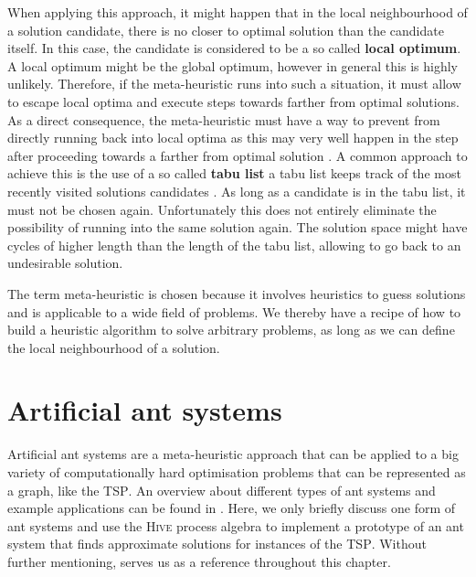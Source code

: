 When applying this approach, it might happen that in the local neighbourhood of a solution candidate, there is no closer to optimal solution than the candidate itself. In this case, the candidate is considered to be a so called \textbf{local optimum}. A local optimum might be the global optimum, however in general this is highly unlikely. Therefore, if the meta-heuristic runs into such a situation, it must allow to escape local optima and execute steps towards farther from optimal solutions. As a direct consequence, the meta-heuristic must have a way to prevent from directly running back into local optima as this may very well happen in the step after proceeding towards a farther from optimal solution \cite{}. A common approach to achieve this is the use of a so called \textbf{tabu list} a tabu list keeps track of the most recently visited solutions candidates \cite{}. As long as a candidate is in the tabu list, it must not be chosen again. Unfortunately this does not entirely eliminate the possibility of running into the same solution again. The solution space might have cycles of higher length than the length of the tabu list, allowing to go back to an undesirable solution.

The term meta-heuristic is chosen because it involves heuristics to guess solutions and is applicable to a wide field of problems. We thereby have a recipe of how to build a heuristic algorithm to solve arbitrary problems, as long as we can define the local neighbourhood of a solution.

\section{Artificial ant systems}
\label{chp:ant_system}
Artificial ant systems are a meta-heuristic approach that can be applied to a big variety of computationally hard optimisation problems that can be represented as a graph, like the \textsc{TSP}. An overview about different types of ant systems and example applications can be found in \cite{Dorigo:2004:ACO:975277}. Here, we only briefly discuss one form of ant systems and use the \textsc{Hive} process algebra to implement a prototype of an ant system that finds approximate solutions for instances of the \textsc{TSP}. Without further mentioning, \cite{Dorigo:2004:ACO:975277} serves us as a reference throughout this chapter.

